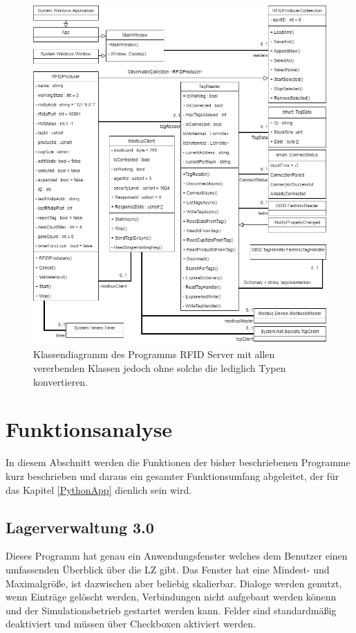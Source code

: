 \begin{figure}
    \caption[Klassendiagramm des Programms RFID Server ]
    {\small Klassendiagramm des Programms RFID Server mit allen vererbenden Klassen jedoch ohne solche die
    lediglich Typen konvertieren.}\label{fig:figure8}
    \includegraphics[width = \textwidth ]{Bilder/RFID_Klassendiagramm}
    \centering
\end{figure}

\newpage
\section{Funktionsanalyse}\label{funktionsanalyse}
In diesem Abschnitt werden die Funktionen der bisher beschriebenen Programme kurz beschrieben und daraus ein gesamter
Funktionsumfang abgeleitet, der für das Kapitel \ref{PythonApp} dienlich sein wird.

\subsection{Lagerverwaltung 3.0}
Dieses Programm hat genau ein Anwendungsfenster welches dem Benutzer einen umfassenden Überblick über die LZ gibt.
Das Fenster hat eine Mindest- und Maximalgröße, ist dazwischen aber beliebig skalierbar. Dialoge werden genutzt, wenn
Einträge gelöscht werden, Verbindungen nicht aufgebaut werden könenn und der Simulationsbetrieb gestartet werden kann.
Felder sind standardmäßig deaktiviert und müssen über Checkboxen aktiviert werden. \\

